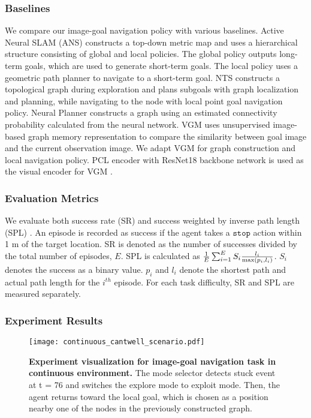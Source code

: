 \documentclass[10pt,twocolumn,letterpaper]{article}
\begin{document}
\subsubsection{Baselines}
We compare our image-goal navigation policy with various baselines.
Active Neural SLAM (ANS) constructs a top-down metric map and uses a hierarchical structure consisting of global and local policies. The global policy outputs long-term goals, which are used to generate short-term goals. The local policy uses a geometric path planner to navigate to a short-term goal. NTS \cite{neuralslam} constructs a topological graph during exploration and plans subgoals with graph localization and planning, while navigating to the node with local point goal navigation policy. Neural Planner \cite{beeching2020learning} constructs a graph using an estimated connectivity probability calculated from the neural network.  VGM \cite{vgm} uses unsupervised image-based graph memory representation to compare the similarity between goal image and the current observation image. We adapt VGM for graph construction and local navigation policy. PCL \cite{li2020prototypical} encoder with ResNet18 \cite{he2016deep} backbone network is used as the visual encoder for VGM \cite{vgm}.

\subsubsection{Evaluation Metrics}
We evaluate both success rate ({SR}) and success weighted by inverse path length ({SPL}) \cite{anderson2018evaluation}. An episode is recorded as success if the agent takes a $\texttt{stop}$ action within 1 m of the target location. {SR} is denoted as the number of successes divided by the total number of episodes, $E$. {SPL} is calculated as ${1\over E}\sum_{i=1}^E S_i {l_i\over{\max(p_i, l_i)}}$. $S_i$ denotes the success as a binary value. $p_i$ and $l_i$ denote the shortest path and actual path length for the $i^{th}$ episode. For each task difficulty, {SR} and {SPL} are measured separately.
\subsubsection{Experiment Results}
\begin{figure*}[t!]{\centering\texttt{[image: continuous\_cantwell\_scenario.pdf]}}\centering
\caption{{\textbf{Experiment visualization for image-goal navigation task in continuous environment.} The mode selector detects stuck event at t = 76 and switches the explore mode to exploit mode. Then, the agent returns toward the local goal, which is chosen as a position nearby one of the nodes in the previously constructed graph.
}}\label{fig:continuous-cantwell-scenario}
\end{figure*}
\end{document}
